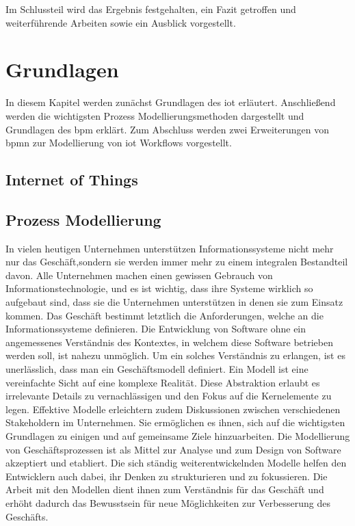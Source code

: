 \documentclass[a4paper, 12pt, twoside, headsepline=true]{scrartcl} %
\begin{document}
Im Schlussteil wird das Ergebnis festgehalten, ein Fazit getroffen und weiterführende Arbeiten sowie ein Ausblick vorgestellt.
 
\newpage

\section{Grundlagen} \label{sec:section2}

In diesem Kapitel werden zunächst Grundlagen des \ac{iot} erläutert. Anschließend werden die wichtigsten Prozess Modellierungsmethoden dargestellt und Grundlagen des \ac{bpm} erklärt. Zum Abschluss werden zwei Erweiterungen von \ac{bpmn} zur Modellierung von \ac{iot} Workflows vorgestellt.

\subsection{Internet of Things}

\subsection{Prozess Modellierung}

In vielen heutigen Unternehmen unterstützen Informationssysteme nicht mehr nur das Geschäft,sondern sie werden immer mehr zu einem integralen Bestandteil davon. Alle Unternehmen machen einen gewissen Gebrauch von Informationstechnologie, und es ist wichtig, dass ihre Systeme wirklich so aufgebaut sind, dass sie die Unternehmen unterstützen in denen sie zum Einsatz kommen. Das Geschäft bestimmt letztlich die Anforderungen, welche an die Informationssysteme definieren. Die Entwicklung von Software ohne ein angemessenes Verständnis des Kontextes, in welchem diese Software betrieben werden soll, ist nahezu unmöglich. Um ein solches Verständnis zu erlangen, ist es unerlässlich, dass man ein Geschäftsmodell definiert. Ein Modell ist eine vereinfachte Sicht auf eine
komplexe Realität. Diese Abstraktion erlaubt es irrelevante Details zu vernachlässigen und den Fokus auf die Kernelemente zu legen. Effektive Modelle erleichtern zudem
Diskussionen zwischen verschiedenen Stakeholdern im Unternehmen.
Sie ermöglichen es ihnen, sich auf die wichtigsten Grundlagen zu einigen und auf gemeinsame Ziele hinzuarbeiten. Die Modellierung von Geschäftsprozessen ist als Mittel zur Analyse und zum Design von Software akzeptiert und etabliert. Die sich ständig weiterentwickelnden Modelle helfen den Entwicklern auch dabei, ihr Denken zu strukturieren und zu fokussieren. Die Arbeit mit den Modellen dient ihnen zum Verständnis für das Geschäft und erhöht dadurch  das Bewusstsein für neue Möglichkeiten zur Verbesserung des Geschäfts.
\end{document}
